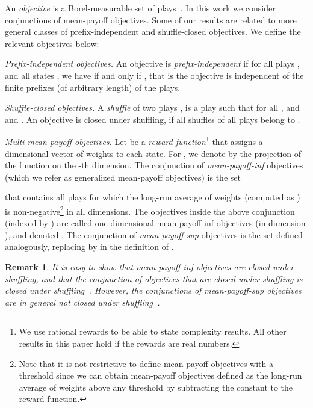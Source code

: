 \documentclass{article}
\newtheorem{remark}{Remark}
\begin{document}
\smallskip{}
An {\em objective} is a Borel-measurable set of plays~\cite{Billingsley}.
In this work we consider conjunctions of mean-payoff objectives. 
Some of our results are related to more general classes of prefix-independent
and shuffle-closed objectives.
We define the relevant objectives below:
\smallskip
\begin{compactenum}
\item {\em Prefix-independent objectives.}
An objective  is \emph{prefix-independent} if for all plays ,
and all states , we have  if and only if ,
that is the objective is independent of the finite prefixes (of arbitrary length) 
of the plays.

\item {\em Shuffle-closed objectives.} 
A \emph{shuffle} of two plays ,  is a play 
such that   for all , and 
 and .
An objective  is closed under shuffling, 
if all shuffles of all plays  belong to .

\item {\em Multi-mean-payoff objectives.}
Let  be a \emph{reward function}\footnote{We use rational
rewards to be able to state complexity results. All other results in this paper
hold if the rewards are real numbers.} 
that assigns a -dimensional vector of weights to each state. 
For , we denote by  the projection of 
the function  on the -th dimension.
The conjunction of \emph{mean-payoff-inf} objectives (which we refer as generalized 
mean-payoff objectives) is the set  

that contains all plays for which the long-run average of weights (computed as )
is non-negative\footnote{Note that it is not restrictive to define mean-payoff objectives with a threshold 
since we can obtain mean-payoff objectives defined as the long-run average of weights 
above any threshold  by subtracting the constant  to the reward function.} 
in all dimensions. 
The objectives inside the above conjunction (indexed by ) are called 
one-dimensional mean-payoff-inf objectives (in dimension ), and denoted .
The conjunction of \emph{mean-payoff-sup} objectives is the set  
defined analogously, replacing  by  in the definition of .
\end{compactenum}


\begin{remark}\label{rmk:mean-payoff-inf-not-closed-under-shuffling}
It is easy to show that mean-payoff-inf objectives are closed under shuffling,
and that the conjunction of objectives that are closed under shuffling
is closed under shuffling~\cite{Kop06}. However, the conjunctions of mean-payoff-sup
objectives are in general not closed under shuffling~\cite[Example~1]{VCDHRR15}.
\end{remark}
\end{document}
